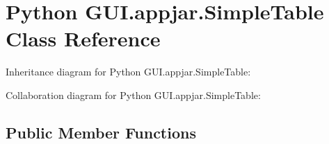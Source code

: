 \hypertarget{class_python_01_g_u_i_1_1appjar_1_1_simple_table}{}\section{Python G\+U\+I.\+appjar.\+Simple\+Table Class Reference}
\label{class_python_01_g_u_i_1_1appjar_1_1_simple_table}


Inheritance diagram for Python G\+U\+I.\+appjar.\+Simple\+Table\+:


Collaboration diagram for Python G\+U\+I.\+appjar.\+Simple\+Table\+:
\subsection*{Public Member Functions}
